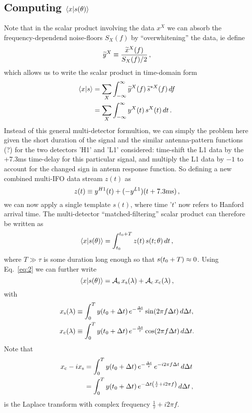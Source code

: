 \documentclass[aps,prd,onecolumn,nofootinbib,superscriptaddress,altaffilletter,floatfix]{revtex4-1}
\begin{document}
\subsection{Computing $\langle x|s(\theta)\rangle$}
\label{sec:computing-scalarxs}

Note that in the scalar product involving the data $x^X$ we can absorb the frequency-dependend noise-floors $S_X(f)$ by ``overwhitening'' the data, ie
define
\begin{equation}
  \label{eq:12}
  \widetilde{y}^X \equiv \frac{\widetilde{x}^X(f)}{S_X(f)/2}\,,
\end{equation}
which allows us to write the scalar product in time-domain form
\begin{align}
  \label{eq:13}
  \langle x|s\rangle &= \sum_X \int_{-\infty}^{\infty} \widetilde{y}^X(f)\,\widetilde{s}^{*X}(f)\,df \\
  &= \sum_X \int_{-\infty}^{\infty} y^X(t)\,s^X(t)\,dt\,.
\end{align}
Instead of this general multi-detector formultion, we can simply the problem here given the short duration of the signal and the similar
antenna-pattern functions (?) for the two detectors 'H1' and 'L1' considered: time-shift the L1 data by the +7.3ms time-delay for this particular
signal, and multiply the L1 data by $-1$ to account for the changed sign in antenn response function.
So defining a new combined multi-IFO data stream $z(t)$ as
\begin{equation}
  \label{eq:14}
  z(t) \equiv y^{H1}(t) + (-y^{L1})(t+7.3\mathrm{ms})\,,
\end{equation}
we can now apply a single template $s(t)$, where time '$t$' now refers to Hanford arrival time.
The multi-detector ``matched-filtering'' scalar product can therefore be written as
\begin{equation}
  \label{eq:15}
  \langle x|s(\theta)\rangle = \int_{t_0}^{t_0 + T} z(t)\,s(t;\theta)\,dt\,,
\end{equation}
where $T \gg \tau$ is some duration long enough so that $s(t_0+T)\approx0$.
Using Eq.~\eqref{eq:2} we can further write
\begin{equation}
  \label{eq:9}
  \langle x|s(\theta)\rangle = \mathcal{A}_{\mathrm{s}}\,x_{\mathrm{s}}(\lambda) + \mathcal{A}_{\mathrm{c}}\,x_{\mathrm{c}}(\lambda)\,,
\end{equation}
with
\begin{align}
  \label{eq:10}
  x_{\mathrm{s}}(\lambda) &\equiv \int_{0}^{T} y(t_0+\Delta t)\,e^{-\frac{\Delta t}{\tau}}\sin(2\pi f\Delta t)\,d\Delta t,\\
  x_{\mathrm{c}}(\lambda) &\equiv \int_{0}^{T} y(t_0+\Delta t)\,e^{-\frac{\Delta t}{\tau}}\cos(2\pi f\Delta t)\,d\Delta t.\\
\end{align}
Note that
\begin{align}
  \label{eq:16}
  x_{\mathrm{c}} - ix_{\mathrm{s}} &= \int_{0}^{T} y(t_0+\Delta t)\,e^{-\frac{\Delta t}{\tau}}\,e^{-i2\pi f\Delta t}\,d\Delta t\\
  &= \int_{0}^{T} y(t_0+\Delta t)\,e^{-\Delta t \left(\frac{1}{\tau} + i2\pi f\right)}\,d\Delta t\,,
\end{align}
is the Laplace transform with complex frequency $\frac{1}{\tau} + i2\pi f$.
\end{document}
